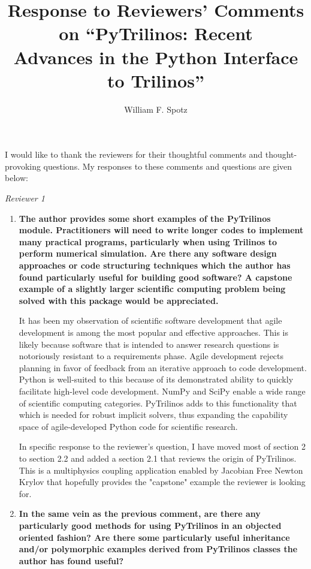\documentclass[11pt]{article}
\title{Response to Reviewers' Comments on ``PyTrilinos: Recent \\
  Advances in the Python Interface to Trilinos''}
\author{William F. Spotz}
\begin{document}
\maketitle

I would like to thank the reviewers for their thoughtful comments and  thought-provoking questions.  My responses to these comments and questions are given below:

{\em Reviewer 1}

\begin{enumerate}

\item {\bf The author provides some short examples of the PyTrilinos module. Practitioners will need to write longer codes to implement many practical programs, particularly when using Trilinos to perform numerical simulation. Are there any software design approaches or code structuring techniques which the author has found particularly useful for building good software? A capstone example of a slightly larger scientific computing problem being solved with this package would be appreciated.}

It has been my observation of scientific software development that agile development is among the most popular and effective approaches.  This is likely because software that is intended to answer research questions is notoriously resistant to a requirements phase.  Agile development rejects planning in favor of feedback from an iterative approach to code development.  Python is well-suited to this because of its demonstrated ability to quickly facilitate high-level code development.  NumPy and SciPy enable a wide range of scientific computing categories.  PyTrilinos adds to this functionality that which is needed for robust implicit solvers, thus expanding the capability space of agile-developed Python code for scientific research.

In specific response to the reviewer's question, I have moved most of section 2 to section 2.2 and added a section 2.1 that reviews the origin of PyTrilinos.  This is a multiphysics coupling application enabled by Jacobian Free Newton Krylov that hopefully provides the "capstone" example the reviewer is looking for.

\item {\bf In the same vein as the previous comment, are there any particularly good methods for using PyTrilinos in an objected oriented fashion? Are there some particularly useful inheritance and/or polymorphic examples derived from PyTrilinos classes the author has found useful?}


\end{enumerate}
\end{document}
